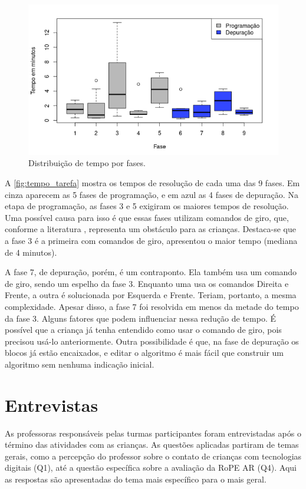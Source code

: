  \begin{figure}[!htpb]
    \centering
    \includegraphics[width=.6\linewidth,fbox]{figs/tempos_por_tarefa.png}
    \caption{Distribuição de tempo por fases.}
    \sourceauthor
    \label{fig:tempo_tarefa}
\end{figure}

A \autoref{fig:tempo_tarefa} mostra os tempos de resolução de cada uma das 9 fases. Em cinza aparecem as 5 fases de programação, e em azul as 4 fases de depuração. Na etapa de programação, as fases 3 e 5 exigiram os maiores tempos de resolução. Uma possível causa para isso é que essas fases utilizam comandos de giro, que, conforme a literatura \cite{piaget_development_1964},  representa um obstáculo para as crianças. Destaca-se que a fase 3 é a primeira com comandos de giro, apresentou o maior tempo (mediana de 4 minutos).

A fase 7, de depuração, porém, é um contraponto. Ela também usa um comando de giro, sendo um espelho da fase 3. Enquanto uma usa os comandos Direita e Frente, a outra é solucionada por Esquerda e Frente. Teriam, portanto, a mesma complexidade. Apesar disso, a fase 7 foi resolvida em menos da metade do tempo da fase 3. Alguns fatores que podem influenciar nessa redução de tempo. É possível que a criança já tenha entendido como usar o comando de giro, pois precisou usá-lo anteriormente. Outra possibilidade é que, na fase de depuração os blocos já estão encaixados, e editar o algoritmo é mais fácil que construir um algoritmo sem nenhuma indicação inicial. 

\section{Entrevistas}
As professoras responsáveis pelas turmas participantes foram entrevistadas após o término das atividades com as crianças. As questões aplicadas partiram de temas gerais, como a percepção do professor sobre o contato de crianças com tecnologias digitais (Q1), até a questão específica sobre a avaliação da RoPE AR (Q4). Aqui as respostas são apresentadas do tema mais específico para o mais geral.

